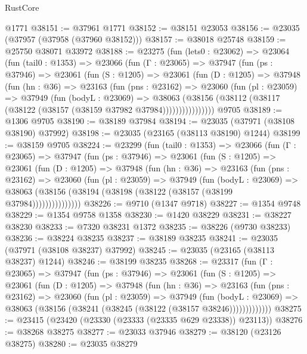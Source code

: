 \begin{lexlean}{RustCore}
\begin{coremodule}
    @1771
@38151 := @37961 @1771
@38152 := @38151 @23053
@38156 := @23035 (@37957 (@37958 (@37960 @38152)))
@38157 := @38018 @25748
@38159 := @25750 @38071 @33972
@38188 := @23275
    (fun (lets0 : @23062) =>
    @23064
      (fun (tail0 : @1353) =>
      @23066
        (fun (Γ : @23065) =>
        @37947
          (fun (ps : @37946) =>
          @23061
            (fun (S : @1205) =>
            @23061
              (fun (D : @1205) =>
              @37948
                (fun (hn : @36) =>
                @23163
                  (fun (pns : @23162) =>
                  @23060
                    (fun (pl : @23059) =>
                    @37949
                      (fun (bodyL : @23069) =>
                      @38063
                        (@38156
                          (@38112 (@38117 (@38122 (@38157 (@38159 @37982 @37984))))))))))))))))
    @9705
@38189 := @1306 @9705
@38190 := @38189 @37984
@38194 := @23035 (@37971 (@38108 @38190) @37992)
@38198 := @23035 (@23165 (@38113 @38190) @1244)
@38199 := @38159 @9705
@38224 := @23299
    (fun (tail0 : @1353) =>
    @23066
      (fun (Γ : @23065) =>
      @37947
        (fun (ps : @37946) =>
        @23061
          (fun (S : @1205) =>
          @23061
            (fun (D : @1205) =>
            @37948
              (fun (hn : @36) =>
              @23163
                (fun (pns : @23162) =>
                @23060
                  (fun (pl : @23059) =>
                  @37949
                    (fun (bodyL : @23069) =>
                    @38063 (@38156 (@38194 (@38198 (@38122 (@38157 (@38199 @37984)))))))))))))))
@38226 := @9710 (@1347 @9718)
@38227 := @1354 @9748
@38229 := @1354 @9758 @1358
@38230 := @1420 @38229
@38231 := @38227 @38230
@38233 := @7320 @38231 @1372
@38235 := @38226 (@9730 @38233)
@38236 := @38224 @38235
@38237 := @38189 @38235
@38241 := @23035 (@37971 (@38108 @38237) @37992)
@38245 := @23035 (@23165 (@38113 @38237) @1244)
@38246 := @38199 @38235
@38268 := @23317
    (fun (Γ : @23065) =>
    @37947
      (fun (ps : @37946) =>
      @23061
        (fun (S : @1205) =>
        @23061
          (fun (D : @1205) =>
          @37948
            (fun (hn : @36) =>
            @23163
              (fun (pns : @23162) =>
              @23060
                (fun (pl : @23059) =>
                @37949
                  (fun (bodyL : @23069) =>
                  @38063 (@38156 (@38241 (@38245 (@38122 (@38157 @38246)))))))))))))
@38275 := @23415 (@23420 (@23330 (@23333 (@23335 @629 @23338)) @23113))
@38276 := @38268 @38275
@38277 := @23033 @37946
@38279 := @38120 (@23126 @38275)
@38280 := @23035 @38279

\end{coremodule}
\end{lexlean}
